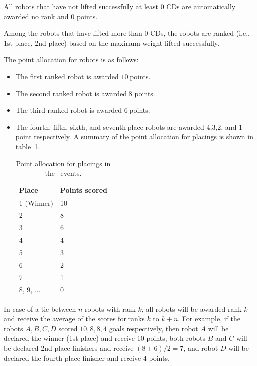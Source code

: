\documentclass[12pt]{hurocup}
\begin{document}
\begin{lawlist}[WL]

\item All robots that have not lifted successfully at least 0 CDs
  are automatically awarded no rank and $0$ points.

\item Among the robots that have lifted more than 0 CDs, the robots are
 ranked (i.e., 1st place, 2nd place) based on the maximum weight
 lifted successfully.

\item The point allocation for robots is as follows:
  \begin{itemize}
  \item The first ranked robot is awarded $10$ points.
  \item The second ranked robot is awarded $8$ points.
  \item The third ranked robot is awarded $6$ points.
  \item The fourth, fifth, sixth, and seventh place robots are awarded
    $4$,$3$,$2$, and $1$ point respectively.  A summary of the point
    allocation for placings is shown in table~\ref{point-allocation}.

    \begin{table}
      \begin{center}
        \begin{tabular}{l|l}
          \hline
          Place & Points scored \\
          \hline
          1 (Winner) & 10 \\
          2          & 8 \\
          3          & 6 \\
          4          & 4 \\
          5          & 3 \\
          6          & 2 \\
          7          & 1 \\
          8, 9, ...  & 0 \\
          \hline
        \end{tabular}
      \end{center}
      \caption{Point allocation for placings in the \HuroCup\ events.}
      \label{point-allocation}
    \end{table}
  \end{itemize}

\item In case of a tie between $n$ robots with rank $k$, all robots
 will be awarded rank $k$ and receive the average of the scores for
 ranks $k$ to $k+n$.  For example, if the robots $A,B,C,D$ scored $10,
 8, 8, 4$ goals respectively, then robot $A$ will be declared the
 winner (1st place) and receive 10 points, both robots $B$ and $C$
 will be declared 2nd place finishers and receive $(8+6)/2=7$, and
 robot $D$ will be declared the fourth place finisher and receive $4$
 points.

\end{lawlist}
\end{document}
